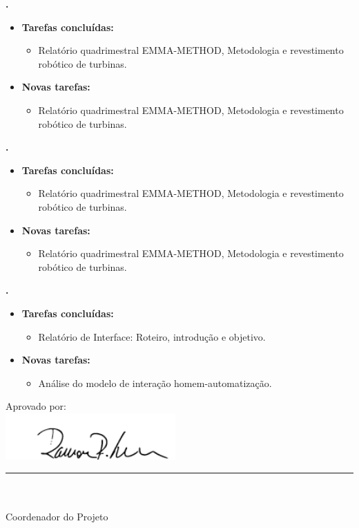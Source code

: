 	
	  \textbf{\elael.} 
	\begin{itemize}
		\item \textbf{Tarefas concluídas:}
			\begin{itemize}    
			\item Relatório quadrimestral EMMA-METHOD, Metodologia e revestimento
			robótico de turbinas.
			\end{itemize}
		
		\item \textbf{Novas tarefas:}
			\begin{itemize} 
				\item Relatório quadrimestral EMMA-METHOD, Metodologia e revestimento
				robótico de turbinas.
			\end{itemize}
	\end{itemize}			
			
  \textbf{\renan.} 
	\begin{itemize}
		\item \textbf{Tarefas concluídas:}
			\begin{itemize}    
				\item Relatório quadrimestral EMMA-METHOD, Metodologia e revestimento
				robótico de turbinas.
			\end{itemize}
		
		\item \textbf{Novas tarefas:}
			\begin{itemize} 
				\item Relatório quadrimestral EMMA-METHOD, Metodologia e revestimento
				robótico de turbinas.
			\end{itemize}
	\end{itemize}	
			
   \textbf{\julia.} 
	\begin{itemize}
		\item \textbf{Tarefas concluídas:}
			\begin{itemize}    
				\item Relatório de Interface: Roteiro, introdução e objetivo.
			\end{itemize}
		
		\item \textbf{Novas tarefas:}
			\begin{itemize} 
			    \item Análise do modelo de interação homem-automatização.
			\end{itemize}
	\end{itemize}		




\vspace{5mm}%
\parbox[t]{70mm}{
  Aprovado por: \\[5mm]
  \centering
  \includegraphics[width=65mm]{figs/logo/assinatura-ramon.png} \\[-4mm]
  \rule[2mm]{70mm}{0.1mm} \\
  \ramon \\[1mm]
  Coordenador do Projeto \\
}

\fim